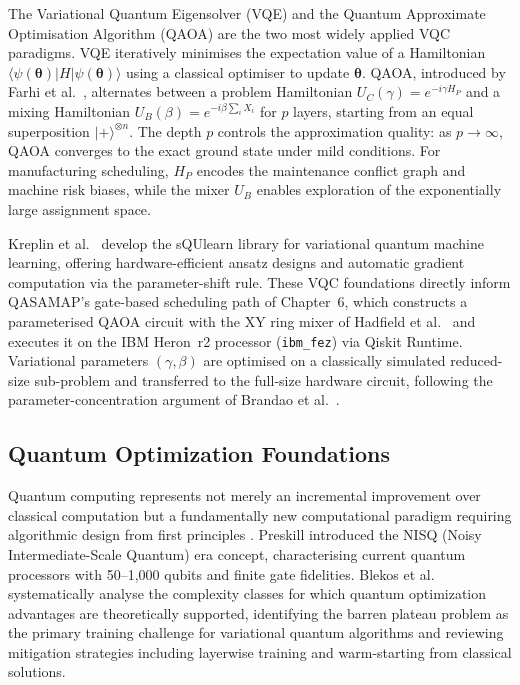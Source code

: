 The Variational Quantum Eigensolver (VQE) and the Quantum Approximate Optimisation Algorithm (QAOA) are the two most widely applied VQC paradigms. VQE iteratively minimises the expectation value of a Hamiltonian $\langle \psi(\boldsymbol{\theta}) | H | \psi(\boldsymbol{\theta}) \rangle$ using a classical optimiser to update $\boldsymbol{\theta}$. QAOA, introduced by Farhi et al.~\cite{Farhi2014}, alternates between a problem Hamiltonian $U_C(\gamma) = e^{-i\gamma H_P}$ and a mixing Hamiltonian $U_B(\beta) = e^{-i\beta \sum_i X_i}$ for $p$ layers, starting from an equal superposition $|+\rangle^{\otimes n}$. The depth $p$ controls the approximation quality: as $p \to \infty$, QAOA converges to the exact ground state under mild conditions. For manufacturing scheduling, $H_P$ encodes the maintenance conflict graph and machine risk biases, while the mixer $U_B$ enables exploration of the exponentially large assignment space.

Kreplin et al.~\cite{kreplin_squlearn_2025} develop the sQUlearn library for variational quantum machine learning, offering hardware-efficient ansatz designs and automatic gradient computation via the parameter-shift rule. These VQC foundations directly inform QASAMAP's gate-based scheduling path of Chapter~6, which constructs a parameterised QAOA circuit with the XY ring mixer of Hadfield et al.\ \cite{Hadfield2019} and executes it on the IBM Heron~r2 processor (\texttt{ibm\_fez}) via Qiskit Runtime. Variational parameters $(\gamma, \beta)$ are optimised on a classically simulated reduced-size sub-problem and transferred to the full-size hardware circuit, following the parameter-concentration argument of Brandao et al.\ \cite{Brandao2018}.

\subsection{Quantum Optimization Foundations}

Quantum computing represents not merely an incremental improvement over classical computation but a fundamentally new computational paradigm requiring algorithmic design from first principles \cite{eldh_quantum_2025}. Preskill \cite{Preskill2018} introduced the NISQ (Noisy Intermediate-Scale Quantum) era concept, characterising current quantum processors with 50--1,000 qubits and finite gate fidelities. Blekos et al. \cite{Blekos2024} systematically analyse the complexity classes for which quantum optimization advantages are theoretically supported, identifying the barren plateau problem as the primary training challenge for variational quantum algorithms and reviewing mitigation strategies including layerwise training and warm-starting from classical solutions.

